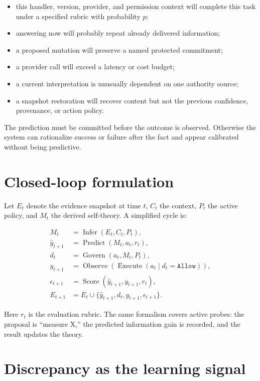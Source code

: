 \documentclass[11pt,oneside]{report}
\begin{document}
\begin{itemize}
  \item this handler, version, provider, and permission context will complete this task under a specified rubric with probability $p$;
  \item answering now will probably repeat already delivered information;
  \item a proposed mutation will preserve a named protected commitment;
  \item a provider call will exceed a latency or cost budget;
  \item a current interpretation is unusually dependent on one authority source;
  \item a snapshot restoration will recover content but not the previous confidence, provenance, or action policy.
\end{itemize}

The prediction must be committed before the outcome is observed. Otherwise the system can rationalize success or failure after the fact and appear calibrated without being predictive.

\section{Closed-loop formulation}

Let $E_t$ denote the evidence snapshot at time $t$, $C_t$ the context, $P_t$ the active policy, and $M_t$ the derived self-theory. A simplified cycle is:

\begin{align*}
M_t &= \operatorname{Infer}(E_t, C_t, P_t),\\
\hat{y}_{t+1} &= \operatorname{Predict}(M_t, a_t, r_t),\\
d_t &= \operatorname{Govern}(a_t, M_t, P_t),\\
y_{t+1} &= \operatorname{Observe}(\operatorname{Execute}(a_t \mid d_t=\texttt{Allow})),\\
\epsilon_{t+1} &= \operatorname{Score}(\hat{y}_{t+1},y_{t+1},r_t),\\
E_{t+1} &= E_t \cup \{\hat{y}_{t+1},d_t,y_{t+1},\epsilon_{t+1}\}.
\end{align*}

Here $r_t$ is the evaluation rubric. The same formalism covers active probes: the proposal is ``measure X,'' the predicted information gain is recorded, and the result updates the theory.

\section{Discrepancy as the learning signal}
\end{document}
